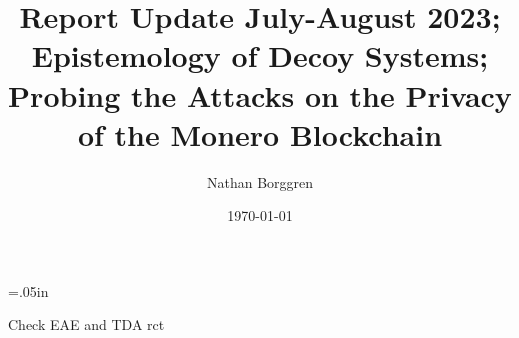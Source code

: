 \documentclass[prc, 12pt]{revtex4-1}
\begin{document}
 
 \topmargin=.05in
 
 \title{Report Update July-August 2023; Epistemology of Decoy Systems; Probing the Attacks on the Privacy of the Monero Blockchain}
 \author{Nathan Borggren}
 \date{\today}

\begin{abstract}

\end{abstract}

\maketitle{}

\tableofcontents





Check \gls{EAE} and \gls{TDA} \gls{rct}














\printnoidxglossaries  



\end{document}
